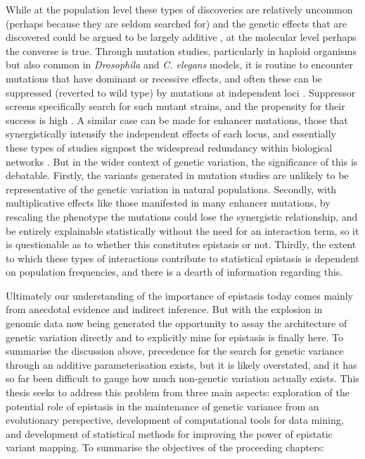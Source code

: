 While at the population level these types of discoveries are relatively uncommon (perhaps because they are seldom searched for) and the genetic effects that are discovered could be argued to be largely additive \citep{Hill2008a}, at the molecular level perhaps the converse is true. Through mutation studies, particularly in haploid organisms but also common in \emph{Drosophila} and \emph{C. elegans} models, it is routine to encounter mutations that have dominant or recessive effects, and often these can be suppressed (reverted to wild type) by mutations at independent loci \citep{Wu1994, Hara1995}. Suppressor screens specifically search for such mutant strains, and the propensity for their success is high \citep{Madigan2009}. A similar case can be made for enhancer mutations, those that synergistically intensify the independent effects of each locus, and essentially these types of studies signpost the widespread redundancy within biological networks \citep{Brookfield1997}. But in the wider context of genetic variation, the significance of this is debatable. Firstly, the variants generated in mutation studies are unlikely to be representative of the genetic variation in natural populations. Secondly, with multiplicative effects like those manifested in many enhancer mutations, by rescaling the phenotype the mutations could lose the synergistic relationship, and be entirely explainable statistically without the need for an interaction term, so it is questionable as to whether this constitutes epistasis or not. Thirdly, the extent to which these types of interactions contribute to statistical epistasis is dependent on population frequencies, and there is a dearth of information regarding this.

Ultimately our understanding of the importance of epistasis today comes mainly from anecdotal evidence and indirect inference. But with the explosion in genomic data now being generated the opportunity to assay the architecture of genetic variation directly and to explicitly mine for epistasis is finally here. To summarise the discussion above, precedence for the search for genetic variance through an additive parameterisation exists, but it is likely overstated, and it has so far been difficult to gauge how much non-genetic variation actually exists. This thesis seeks to address this problem from three main aspects: exploration of the potential role of epistasis in the maintenance of genetic variance from an evolutionary perspective, development of computational tools for data mining, and development of statistical methods for improving the power of epistatic variant mapping. To summarise the objectives of the proceeding chapters:

